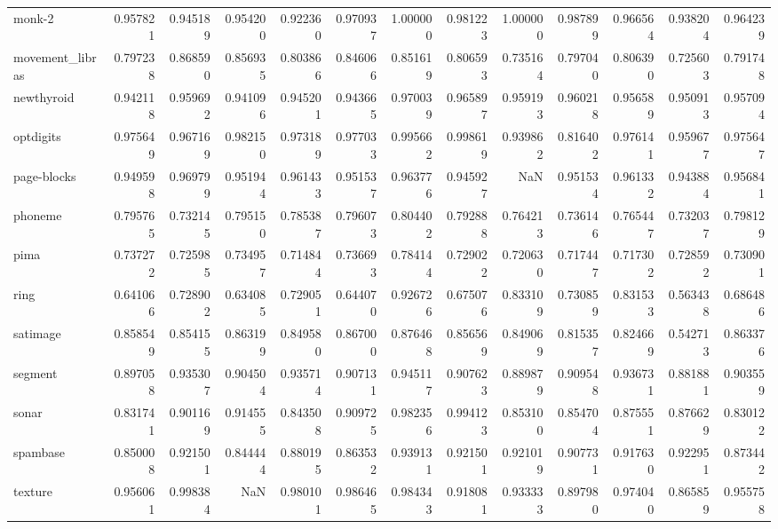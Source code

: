 \begin{tabular}{lrrrrrrrrrrrr}
monk-2          &   0.957821 &  0.945189 &  0.954200 &  0.922360 &  0.970937 &  1.000000 &  0.981223 &  1.000000 &  0.987899 &  0.966564 &  0.938204 &  0.964239 \\
movement\_libras &   0.797238 &  0.868590 &  0.856935 &  0.803866 &  0.846066 &  0.851619 &  0.806593 &  0.735164 &  0.797040 &  0.806390 &  0.725603 &  0.791748 \\
newthyroid      &   0.942118 &  0.959692 &  0.941096 &  0.945201 &  0.943665 &  0.970039 &  0.965897 &  0.959193 &  0.960218 &  0.956589 &  0.950913 &  0.957094 \\
optdigits       &   0.975649 &  0.967169 &  0.982150 &  0.973189 &  0.977033 &  0.995662 &  0.998619 &  0.939862 &  0.816402 &  0.976141 &  0.959677 &  0.975647 \\
page-blocks     &   0.949598 &  0.969799 &  0.951944 &  0.961433 &  0.951537 &  0.963776 &  0.945927 &       NaN &  0.951534 &  0.961332 &  0.943884 &  0.956841 \\
phoneme         &   0.795765 &  0.732145 &  0.795150 &  0.785387 &  0.796073 &  0.804402 &  0.792888 &  0.764213 &  0.736146 &  0.765447 &  0.732037 &  0.798129 \\
pima            &   0.737272 &  0.725985 &  0.734957 &  0.714844 &  0.736693 &  0.784144 &  0.729022 &  0.720630 &  0.717447 &  0.717302 &  0.728592 &  0.730901 \\
ring            &   0.641066 &  0.728902 &  0.634085 &  0.729051 &  0.644070 &  0.926726 &  0.675076 &  0.833109 &  0.730859 &  0.831533 &  0.563438 &  0.686486 \\
satimage        &   0.858549 &  0.854155 &  0.863199 &  0.849580 &  0.867000 &  0.876468 &  0.856569 &  0.849069 &  0.815357 &  0.824669 &  0.542713 &  0.863376 \\
segment         &   0.897058 &  0.935307 &  0.904504 &  0.935714 &  0.907131 &  0.945117 &  0.907623 &  0.889879 &  0.909548 &  0.936731 &  0.881881 &  0.903559 \\
sonar           &   0.831741 &  0.901169 &  0.914555 &  0.843508 &  0.909725 &  0.982356 &  0.994123 &  0.853100 &  0.854704 &  0.875551 &  0.876629 &  0.830122 \\
spambase        &   0.850008 &  0.921501 &  0.844444 &  0.880195 &  0.863532 &  0.939131 &  0.921501 &  0.921019 &  0.907731 &  0.917630 &  0.922951 &  0.873442 \\
texture         &   0.956061 &  0.998384 &       NaN &  0.980101 &  0.986465 &  0.984343 &  0.918081 &  0.933333 &  0.897980 &  0.974040 &  0.865859 &  0.955758 \\

\end{tabular}

